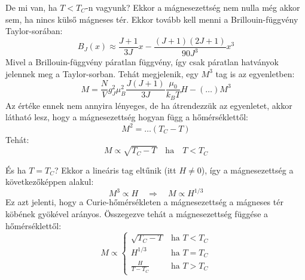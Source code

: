 \documentclass[../main.tex]{subfiles}
\begin{document}
De mi van, ha $T < T_C$-n vagyunk? Ekkor a mágnesezettség nem nulla még akkor sem, ha nincs külső mágneses tér. Ekkor tovább kell menni a Brillouin-függvény Taylor-sorában:
\begin{equation}
    B_J(x) \approx \frac{J + 1}{3 J} x - \frac{(J + 1)(2J + 1)}{90 J^3} x^3
\end{equation}
Mivel a Brillouin-függvény páratlan függvény, így csak páratlan hatványok jelennek meg a Taylor-sorban. Tehát megjelenik, egy $M^3$ tag is az egyenletben:
\begin{equation}
    M = \frac{N}{V} g^2_J \mu^2_B \frac{J(J + 1)}{3 J} \frac{\mu_0}{k_B T} H  - (\dots) M^3
\end{equation}
Az értéke ennek nem annyira lényeges, de ha átrendezzük az egyenletet, akkor látható lesz, hogy a mágnesezettség hogyan függ a hőmérséklettől:
\begin{equation}
    M^2 = \ldots (T_C - T)
\end{equation}
Tehát:
\begin{equation}
    \boxed{M \propto \sqrt{T_C - T} \quad \text{ha} \quad T < T_C}
\end{equation}

És ha $T = T_C$? Ekkor a lineáris tag eltűnik (itt $H \neq 0$), így a mágnesezettség a következőképpen alakul:
\begin{equation}
    M^3 \propto H \quad \Rightarrow \quad M \propto H^{1/3}
\end{equation}
Ez azt jelenti, hogy a Curie-hőmérsékleten a mágnesezettség a mágneses tér köbének gyökével arányos. Összegezve tehát a mágnesezettség függése a hőmérséklettől:
\begin{equation}
    M \propto \begin{cases}
        \sqrt{T_C - T} & \text{ha } T < T_C \\
        H^{1/3} & \text{ha } T = T_C \\
        \frac{H}{T - T_C} & \text{ha } T > T_C
    \end{cases}
\end{equation}
\end{document}
